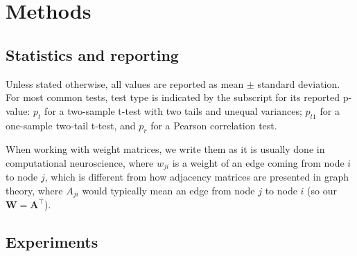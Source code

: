 \documentclass{article}
\begin{document}
\section*{Methods}


\subsection*{Statistics and reporting}

Unless stated otherwise, all values are reported as mean $\pm$ standard deviation. For most common tests, test type is indicated by the subscript for its reported p-value: $p_t$ for a two-sample t-test with two tails and unequal variances; $p_{t1}$ for a one-sample two-tail t-test, and $p_r$ for a Pearson correlation test.

When working with weight matrices, we write them as it is usually done in computational neuroscience, where $w_{ji}$ is a weight of an edge coming from node $i$ to node $j$, which is different from how adjacency matrices are presented in graph theory, where $A_{ji}$ would typically mean an edge from node $j$ to node $i$ (so our $\mathbf{W} = \mathbf{A}^\top$).

\subsection*{Experiments}
\end{document}
